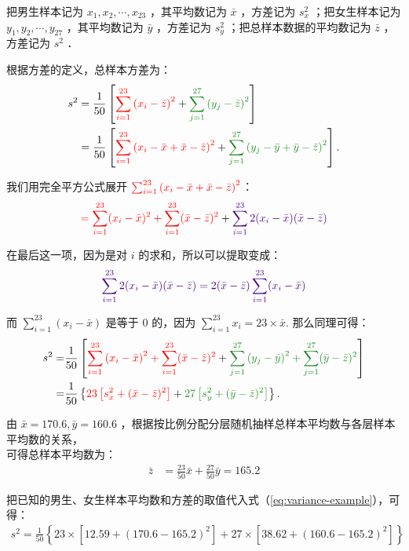 \begin{solution}
    把男生样本记为 $x_1, x_2, \cdots, x_{23}$ ，其平均数记为 $\bar{x}$ ，方差记为 $s_x^2$ ；把女生样本记为 $y_1, y_2, \cdots, y_{27}$ ，其平均数记为 $\bar{y}$ ，方差记为 $s_y^2$ ；把总样本数据的平均数记为 $\bar{z}$ ，方差记为 $s^2$ ．

    根据方差的定义，总样本方差为：
    $$
        \begin{aligned}
            s^2 & =\frac{1}{50}\left[\textcolor{red}{\sum_{i=1}^{23}\left(x_i-\bar{z}\right)^2}+\textcolor{ForestGreen}{\sum_{j=1}^{27}\left(y_j-\bar{z}\right)^2}\right]                                   \\
                & =\frac{1}{50}\left[\textcolor{red}{\sum_{i=1}^{23}\left(x_i-\bar{x}+\bar{x}-\bar{z}\right)^2}+\textcolor{ForestGreen}{\sum_{j=1}^{27}\left(y_j-\bar{y}+\bar{y}-\bar{z}\right)^2}\right] .
        \end{aligned}
    $$

    我们用完全平方公式展开 $\textcolor{red}{
            \sum_{i=1}^{23}\left(x_i-\bar{x}+\bar{x}-\bar{z}\right)^2
        }$：
    $$
        \textcolor{red}{
            = \sum_{i=1}^{23} (x_i - \bar{x})^2 + \sum_{i=1}^{23} (\bar{x} - \bar{z})^2} + \textcolor{Indigo}{\sum_{i=1}^{23} 2(x_i - \bar{x})(\bar{x} - \bar{z})
        }
    $$

    在最后这一项，因为是对 $i$ 的求和，所以可以提取变成：
    $$ \textcolor{Indigo}{\sum_{i=1}^{23} 2(x_i - \bar{x})(\bar{x} - \bar{z}) = 2(\bar{x} - \bar{z}) \sum_{i=1}^{23}(x_i - \bar{x})}$$

    而 $\sum_{i=1}^{23}(x_i - \bar{x})$ 是等于 0 的，因为 $\sum_{i=1}^{23} x_i = 23 \times \bar{x}$. 那么同理可得：
    \begin{align} \label{eq:variance-example}
        s^2= & \frac{1}{50}\left[\textcolor{red}{\sum_{i=1}^{23}\left(x_i-\bar{x}\right)^2+\sum_{i=1}^{23}(\bar{x}-\bar{z})^2}+\textcolor{ForestGreen}{\sum_{j=1}^{27}\left(y_j-\bar{y}\right)^2+\sum_{j=1}^{27}(\bar{y}-\bar{z})^2}\right] \notag \\
        =    & \frac{1}{50}\left\{\textcolor{red}{23\left[s_x^2+(\bar{x}-\bar{z})^2\right]}+\textcolor{ForestGreen}{27\left[s_y^2+(\bar{y}-\bar{z})^2\right]}\right\}.
    \end{align}

    由 $\bar{x}=170.6, \bar{y}=160.6$ ，根据按比例分配分层随机抽样总样本平均数与各层样本平均数的关系，\\ 可得总样本平均数为：
    $$
        \begin{aligned}
            \bar{z} & =\frac{23}{50} \bar{x}+\frac{27}{50} \bar{y} = 165.2
        \end{aligned}
    $$

    把已知的男生、女生样本平均数和方差的取值代入式（\ref{eq:variance-example}），可得：
    $$
        \begin{aligned}
            s^2=\frac{1}{50}\left\{23 \times\left[12.59+(170.6-165.2)^2\right]+27 \times\left[38.62+(160.6-165.2)^2\right]\right\}
        \end{aligned}
    $$
\end{solution}

